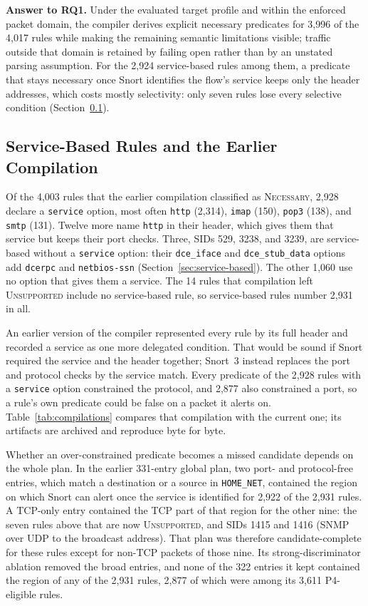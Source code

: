 \documentclass{article}
\begin{document}
\noindent\textbf{Answer to RQ1.} Under the evaluated target profile and
within the enforced packet domain, the compiler derives explicit necessary
predicates for 3,996 of the 4,017 rules while making the remaining semantic
limitations visible; traffic outside that domain is retained by failing open
rather than by an unstated parsing assumption. For the 2,924 service-based
rules among them, a predicate that stays necessary once Snort identifies the
flow's service keeps only the header addresses, which costs mostly
selectivity: only seven rules lose every selective condition
(Section~\ref{sec:service-exposure}).

\subsection{Service-Based Rules and the Earlier Compilation}
\label{sec:service-exposure}
Of the 4,003 rules that the earlier compilation classified as
\textsc{Necessary}, 2,928 declare a \texttt{service} option, most often
\texttt{http} (2,314), \texttt{imap} (150), \texttt{pop3} (138), and
\texttt{smtp} (131). Twelve more name \texttt{http} in their header, which
gives them that service but keeps their port checks. Three, SIDs 529, 3238,
and 3239, are service-based without a \texttt{service} option: their
\texttt{dce\_iface} and \texttt{dce\_stub\_data} options add \texttt{dcerpc}
and \texttt{netbios-ssn} (Section~\ref{sec:service-based}). The other 1,060
use no option that gives them a service. The 14 rules that compilation left
\textsc{Unsupported} include no service-based rule, so service-based rules
number 2,931 in all.

An earlier version of the compiler represented every rule by its full
header and recorded a service as one more delegated condition. That would be
sound if Snort required the service and the header together; Snort~3 instead
replaces the port and protocol checks by the service match. Every predicate
of the 2,928 rules with a \texttt{service} option constrained the protocol,
and 2,877 also constrained a port, so a rule's own predicate could be false
on a packet it alerts on. Table~\ref{tab:compilations} compares that
compilation with the current one; its artifacts are archived and reproduce
byte for byte.

Whether an over-constrained predicate becomes a missed candidate depends on
the whole plan. In the earlier 331-entry global plan, two port- and
protocol-free entries, which match a destination or a source in
\texttt{HOME\_NET}, contained the region on which Snort can alert once the
service is identified for 2,922 of the 2,931 rules. A TCP-only entry
contained the TCP part of that region for the other nine: the seven rules
above that are now \textsc{Unsupported}, and SIDs 1415 and 1416 (SNMP over
UDP to the broadcast address). That plan was therefore candidate-complete for
these rules except for non-TCP packets of those nine. Its
strong-discriminator ablation removed the broad entries, and none of the 322
entries it kept contained the region of any of the 2,931 rules, 2,877 of
which were among its 3,611 P4-eligible rules.
\end{document}
